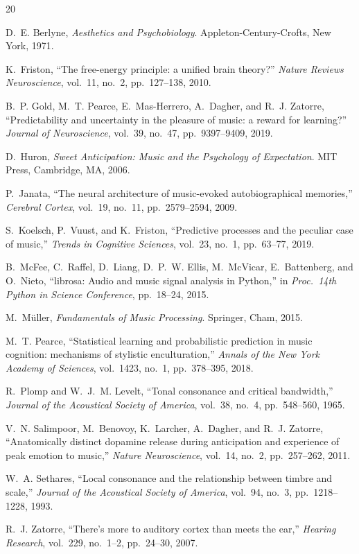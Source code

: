 \documentclass[10pt,twocolumn]{article}
\begin{document}
\begin{thebibliography}{20}
\small

D.~E. Berlyne,
\emph{Aesthetics and Psychobiology}.
Appleton-Century-Crofts, New York, 1971.

K.~Friston,
``The free-energy principle: a unified brain theory?''
\emph{Nature Reviews Neuroscience}, vol.~11, no.~2, pp.~127--138, 2010.

B.~P. Gold, M.~T. Pearce, E.~Mas-Herrero, A.~Dagher, and R.~J. Zatorre,
``Predictability and uncertainty in the pleasure of music: a reward for learning?''
\emph{Journal of Neuroscience}, vol.~39, no.~47, pp.~9397--9409, 2019.

D.~Huron,
\emph{Sweet Anticipation: Music and the Psychology of Expectation}.
MIT Press, Cambridge, MA, 2006.

P.~Janata,
``The neural architecture of music-evoked autobiographical memories,''
\emph{Cerebral Cortex}, vol.~19, no.~11, pp.~2579--2594, 2009.

S.~Koelsch, P.~Vuust, and K.~Friston,
``Predictive processes and the peculiar case of music,''
\emph{Trends in Cognitive Sciences}, vol.~23, no.~1, pp.~63--77, 2019.

B.~McFee, C.~Raffel, D.~Liang, D.~P.~W. Ellis, M.~McVicar, E.~Battenberg, and O.~Nieto,
``librosa: Audio and music signal analysis in Python,''
in \emph{Proc.\ 14th Python in Science Conference}, pp.~18--24, 2015.

M.~M{\"u}ller,
\emph{Fundamentals of Music Processing}.
Springer, Cham, 2015.

M.~T. Pearce,
``Statistical learning and probabilistic prediction in music cognition: mechanisms of stylistic enculturation,''
\emph{Annals of the New York Academy of Sciences}, vol.~1423, no.~1, pp.~378--395, 2018.

R.~Plomp and W.~J.~M. Levelt,
``Tonal consonance and critical bandwidth,''
\emph{Journal of the Acoustical Society of America}, vol.~38, no.~4, pp.~548--560, 1965.

V.~N. Salimpoor, M.~Benovoy, K.~Larcher, A.~Dagher, and R.~J. Zatorre,
``Anatomically distinct dopamine release during anticipation and experience of peak emotion to music,''
\emph{Nature Neuroscience}, vol.~14, no.~2, pp.~257--262, 2011.

W.~A. Sethares,
``Local consonance and the relationship between timbre and scale,''
\emph{Journal of the Acoustical Society of America}, vol.~94, no.~3, pp.~1218--1228, 1993.

R.~J. Zatorre,
``There's more to auditory cortex than meets the ear,''
\emph{Hearing Research}, vol.~229, no.~1--2, pp.~24--30, 2007.

\end{thebibliography}
\end{document}
